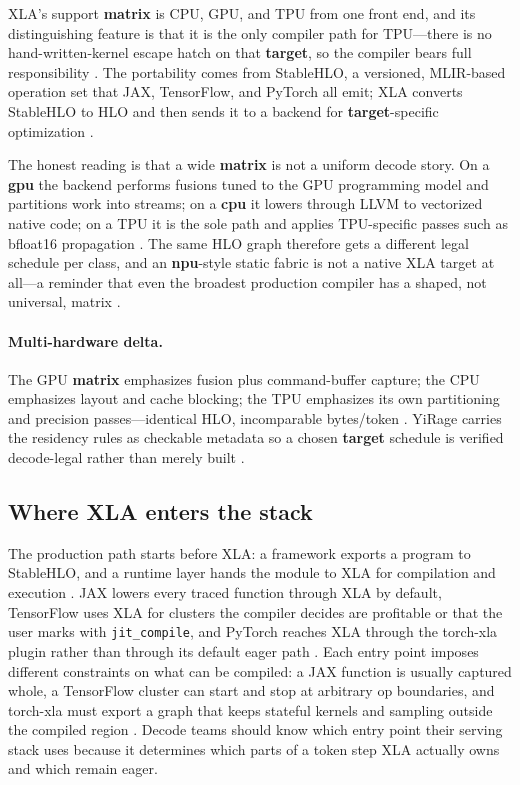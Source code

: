 XLA's support \textbf{matrix} is CPU, GPU, and TPU from one front end, and its distinguishing feature is that it is the only compiler path for TPU---there is no hand-written-kernel escape hatch on that \textbf{target}, so the compiler bears full responsibility \citep{openxla2024}. The portability comes from StableHLO, a versioned, MLIR-based operation set that JAX, TensorFlow, and PyTorch all emit; XLA converts StableHLO to HLO and then sends it to a backend for \textbf{target}-specific optimization \citep{openxla2024,lai2023relax}.

The honest reading is that a wide \textbf{matrix} is not a uniform decode story. On a \textbf{gpu} the backend performs fusions tuned to the GPU programming model and partitions work into streams; on a \textbf{cpu} it lowers through LLVM to vectorized native code; on a TPU it is the sole path and applies TPU-specific passes such as bfloat16 propagation \citep{openxla2024}. The same HLO graph therefore gets a different legal schedule per class, and an \textbf{npu}-style static fabric is not a native XLA target at all---a reminder that even the broadest production compiler has a shaped, not universal, matrix \citep{amd2024xdna,amd2024aie}.

\paragraph{Multi-hardware delta.} The GPU \textbf{matrix} emphasizes fusion plus command-buffer capture; the CPU emphasizes layout and cache blocking; the TPU emphasizes its own partitioning and precision passes---identical HLO, incomparable bytes/token \citep{openxla2024,semianalysis2024tma}. YiRage carries the residency rules as checkable metadata so a chosen \textbf{target} schedule is verified decode-legal rather than merely built \citep{yirage2026}.

\subsection{Where XLA enters the stack}

The production path starts before XLA: a framework exports a program to StableHLO, and a runtime layer hands the module to XLA for compilation and execution \citep{openxla2024,lai2023relax}. JAX lowers every traced function through XLA by default, TensorFlow uses XLA for clusters the compiler decides are profitable or that the user marks with \texttt{jit\_compile}, and PyTorch reaches XLA through the torch-xla plugin rather than through its default eager path \citep{openxla2024,kwon2023vllm}. Each entry point imposes different constraints on what can be compiled: a JAX function is usually captured whole, a TensorFlow cluster can start and stop at arbitrary op boundaries, and torch-xla must export a graph that keeps stateful kernels and sampling outside the compiled region \citep{patel2025llminference,chen2020compilerbasedhardw}. Decode teams should know which entry point their serving stack uses because it determines which parts of a token step XLA actually owns and which remain eager.

